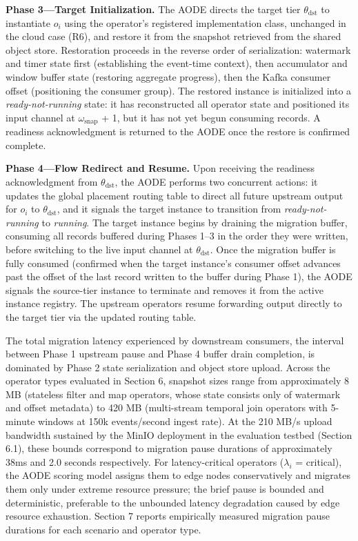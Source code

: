 \documentclass[preprint,review,12pt]{elsarticle}
\begin{document}
\textbf{Phase 3—Target Initialization.} The AODE directs the target tier $\theta_{\text{dst}}$ to instantiate $o_i$ using the operator's registered implementation class, unchanged in the cloud case (R6), and restore it from the snapshot retrieved from the shared object store. Restoration proceeds in the reverse order of serialization: watermark and timer state first (establishing the event-time context), then accumulator and window buffer state (restoring aggregate progress), then the Kafka consumer offset (positioning the consumer group). The restored instance is initialized into a \emph{ready-not-running} state: it has reconstructed all operator state and positioned its input channel at $\omega_{\text{snap}}$ + 1, but it has not yet begun consuming records. A readiness acknowledgment is returned to the AODE once the restore is confirmed complete.

\textbf{Phase 4—Flow Redirect and Resume.} Upon receiving the readiness acknowledgment from $\theta_{\text{dst}}$, the AODE performs two concurrent actions: it updates the global placement routing table to direct all future upstream output for $o_i$ to $\theta_{\text{dst}}$, and it signals the target instance to transition from \emph{ready-not-running} to \emph{running}. The target instance begins by draining the migration buffer, consuming all records buffered during Phases 1--3 in the order they were written, before switching to the live input channel at $\theta_{\text{dst}}$. Once the migration buffer is fully consumed (confirmed when the target instance's consumer offset advances past the offset of the last record written to the buffer during Phase 1), the AODE signals the source-tier instance to terminate and removes it from the active instance registry. The upstream operators resume forwarding output directly to the target tier via the updated routing table.

The total migration latency experienced by downstream consumers, the interval between Phase 1 upstream pause and Phase 4 buffer drain completion, is dominated by Phase 2 state serialization and object store upload. Across the operator types evaluated in Section 6, snapshot sizes range from approximately 8 MB (stateless filter and map operators, whose state consists only of watermark and offset metadata) to 420 MB (multi-stream temporal join operators with 5-minute windows at 150k events/second ingest rate). At the 210 MB/s upload bandwidth sustained by the MinIO deployment in the evaluation testbed (Section 6.1), these bounds correspond to migration pause durations of approximately 38ms and 2.0 seconds respectively. For latency-critical operators ($\lambda_i$ = critical), the AODE scoring model assigns them to edge nodes conservatively and migrates them only under extreme resource pressure; the brief pause is bounded and deterministic, preferable to the unbounded latency degradation caused by edge resource exhaustion. Section 7 reports empirically measured migration pause durations for each scenario and operator type.
\end{document}
